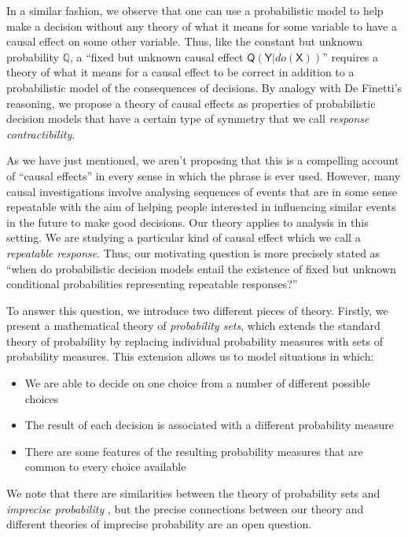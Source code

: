 \documentclass{article}
\theoremstyle{plain}
\theoremstyle{definition}
\newcommand{\RV}[1]{\ensuremath{\mathsf{#1}}}
\newcommand{\prob}[1]{\ensuremath{\mathbb{#1}}}
\begin{document}
In a similar fashion, we observe that one can use a probabilistic model to help make a decision without any theory of what it means for some variable to have a causal effect on some other variable. Thus, like the constant but unknown probability $\prob{Q}$, a ``fixed but unknown causal effect $\RV{Q}(\RV{Y}|do(\RV{X}))$'' requires a theory of what it means for a causal effect to be correct in addition to a probabilistic model of the consequences of decisions. By analogy with De Finetti's reasoning, we propose a theory of causal effects as properties of probabilistic decision models that have a certain type of symmetry that we call \emph{response contractibility}.

As we have just mentioned, we aren't proposing that this is a compelling account of ``causal effects'' in every sense in which the phrase is ever used. However, many causal investigations involve analysing sequences of events that are in some sense repeatable with the aim of helping people interested in influencing similar events in the future to make good decisions. Our theory applies to analysis in this setting. We are studying a particular kind of causal effect which we call a \emph{repeatable response}. Thus, our motivating question is more precisely stated as ``when do probabilistic decision models entail the existence of fixed but unknown conditional probabilities representing repeatable responses?''

To answer this question, we introduce two different pieces of theory. Firstly, we present a mathematical theory of \emph{probability sets}, which extends the standard theory of probability by replacing individual probability measures with sets of probability measures. This extension allows us to model situations in which:
\begin{itemize}
  \item We are able to decide on one choice from a number of different possible choices
  \item The result of each decision is associated with a different probability measure
  \item There are some features of the resulting probability measures that are common to every choice available
\end{itemize}
We note that there are similarities between the theory of probability sets and \emph{imprecise probability} \citep{walley_statistical_1991}, but the precise connections between our theory and different theories of imprecise probability are an open question.
\end{document}
